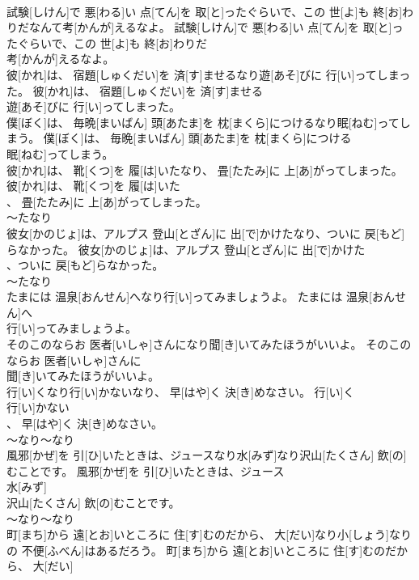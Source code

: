 \documentclass[8pt]{extreport}
\begin{document}
\begin{CJK}{UTF8}{min}
\\	試験[しけん]で 悪[わる]い 点[てん]を 取[と]ったぐらいで、この 世[よ]も 終[お]わりだなんて考[かんが]えるなよ。	試験[しけん]で 悪[わる]い 点[てん]を 取[と]ったぐらいで、この 世[よ]も 終[お]わりだ
\\	考[かんが]えるなよ。	
\\	彼[かれ]は、 宿題[しゅくだい]を 済[す]ませるなり遊[あそ]びに 行[い]ってしまった。	彼[かれ]は、 宿題[しゅくだい]を 済[す]ませる
\\	遊[あそ]びに 行[い]ってしまった。	
\\	僕[ぼく]は、 毎晩[まいばん] 頭[あたま]を 枕[まくら]につけるなり眠[ねむ]ってしまう。	僕[ぼく]は、 毎晩[まいばん] 頭[あたま]を 枕[まくら]につける
\\	眠[ねむ]ってしまう。	
\\	彼[かれ]は、 靴[くつ]を 履[は]いたなり、 畳[たたみ]に 上[あ]がってしまった。	彼[かれ]は、 靴[くつ]を 履[は]いた
\\	、 畳[たたみ]に 上[あ]がってしまった。	
\\	～たなり 
\\	彼女[かのじょ]は、アルプス 登山[とざん]に 出[で]かけたなり、ついに 戻[もど]らなかった。	彼女[かのじょ]は、アルプス 登山[とざん]に 出[で]かけた
\\	、ついに 戻[もど]らなかった。	
\\	～たなり 
\\	たまには 温泉[おんせん]へなり行[い]ってみましょうよ。	たまには 温泉[おんせん]へ
\\	行[い]ってみましょうよ。	
\\	そのこのならお 医者[いしゃ]さんになり聞[き]いてみたほうがいいよ。	そのこのならお 医者[いしゃ]さんに
\\	聞[き]いてみたほうがいいよ。	
\\	行[い]くなり行[い]かないなり、 早[はや]く 決[き]めなさい。	行[い]く
\\	行[い]かない
\\	、 早[はや]く 決[き]めなさい。	
\\	～なり～なり
\\	風邪[かぜ]を 引[ひ]いたときは、ジュースなり水[みず]なり沢山[たくさん] 飲[の]むことです。	風邪[かぜ]を 引[ひ]いたときは、ジュース
\\	水[みず]
\\	沢山[たくさん] 飲[の]むことです。	
\\	～なり～なり
\\	町[まち]から 遠[とお]いところに 住[す]むのだから、 大[だい]なり小[しょう]なりの 不便[ふべん]はあるだろう。	町[まち]から 遠[とお]いところに 住[す]むのだから、 大[だい]

\end{CJK}
\end{document}
